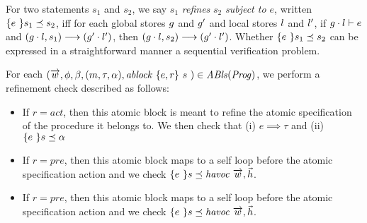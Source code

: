 For two statements $s_1$ and $s_2$, we say $s_1$ {\em refines} $s_2$
{\em subject to $e$}, written $\{ {e}\ \} {s_1} \preceq {s_2}$, iff for each global
stores $g$ and $g'$ and local stores $l$ and $l'$,
if $g \cdot l \vdash e$ and $(g \cdot l, s_1)
\longrightarrow (g' \cdot l')$, then $(g \cdot l, s_2)
\longrightarrow (g' \cdot l')$. Whether $\{ {e}\ \} {s_1} \preceq {s_2}$ can be
expressed in a straightforward manner a sequential verification
problem.

For each $(\overrightarrow{w},  \phi, \beta, (m, \tau, \alpha), \mathit{ablock}\ {\{e,r\}}\ {s}\ ) \in \mathit{ABls}(\mathit{Prog})$, we perform a refinement check described as follows:
\begin{itemize}
\item If $r = \mathit{act}$, then this atomic block is meant to refine the atomic specification of the procedure it belongs to. We then check that 
(i) $e \implies \tau$ and 
(ii) $\{ {e}\ \} {s} \preceq {\alpha}$
\item If $r = \mathit{pre}$, then this atomic block maps to a self loop before the atomic specification action and we check $\{ {e}\ \} {s} \preceq {\mathit{havoc }\ \overrightarrow{w}, \vec{h}}$. 
\item If $r = \mathit{pre}$, then this atomic block maps to a self loop before the atomic specification action and we check $\{ {e}\ \} {s} \preceq {\mathit{havoc }\ \overrightarrow{w}, \vec{h}}$. 
\end{itemize}


